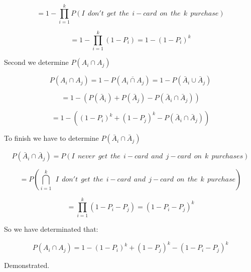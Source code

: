 \documentclass{article}
\begin{document}
$$= 1 - \prod_{i=1}^k P(I \ \ don't \ \ get \ \ the \ \ i-card \ \ on \ \ the \ \ k \ \ purchase)$$

$$= 1 - \prod_{i=1}^k (1 - P_i) = 1 - (1 - P_i)^k$$

\bigskip

Second we determine $P(A_i \cap A_j)$

$$P(A_i \cap A_j) = 1 - P(\overline{A_i \cap A_j}) = 1 - P(\bar A_i \cup \bar A_j)$$

$$= 1 - (P(\bar A_i) + P(\bar A_j) - P(\bar A_i \cap \bar A_j))$$

$$= 1 - ((1 - P_i)^k + (1 - P_j)^k - P(\bar A_i \cap \bar A_j))$$

\bigskip

To finish we have to determine $P(\bar A_i \cap \bar A_j)$

$$P(\bar A_i \cap \bar A_j) = P(I \ \ never \ \ get \ \ the \ \ i-card \ \ and \ \ j-card \ \ on \ \ k \ \ purchases)$$

$$= P(\bigcap_{i=1}^k \ \ I \ \ don't \ \ get \ \ the \ \ i-card \ \ and \ \ j-card \ \ on \ \ the \ \ k \ \ purchase)$$

$$= \prod_{i=1}^k (1- P_i - P_j) = (1 - P_i - P_j)^k$$

\bigskip

So we have determinated that:

$$P(A_i \cap A_j) = 1 - (1 - P_i)^k + (1 - P_j)^k - (1 - P_i - P_j)^k$$

\bigskip

Demonstrated.
\end{document}
